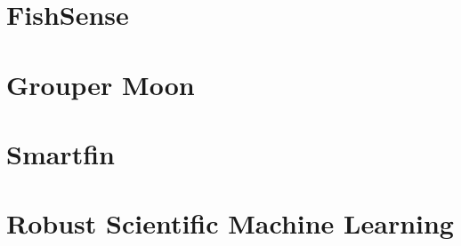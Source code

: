 \section{FishSense}

\section{Grouper Moon}

\section{Smartfin}

\section{Robust Scientific Machine Learning}

